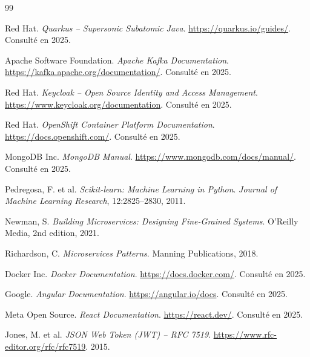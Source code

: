 \documentclass[12pt,a4paper]{report}
\begin{document}
\begin{thebibliography}{99}

Red Hat. \textit{Quarkus -- Supersonic Subatomic Java}.
\url{https://quarkus.io/guides/}. Consult\'e en 2025.

Apache Software Foundation. \textit{Apache Kafka Documentation}.
\url{https://kafka.apache.org/documentation/}. Consult\'e en 2025.

Red Hat. \textit{Keycloak -- Open Source Identity and Access Management}.
\url{https://www.keycloak.org/documentation}. Consult\'e en 2025.

Red Hat. \textit{OpenShift Container Platform Documentation}.
\url{https://docs.openshift.com/}. Consult\'e en 2025.

MongoDB Inc. \textit{MongoDB Manual}.
\url{https://www.mongodb.com/docs/manual/}. Consult\'e en 2025.

Pedregosa, F. et al. \textit{Scikit-learn: Machine Learning in Python}.
\textit{Journal of Machine Learning Research}, 12:2825--2830, 2011.

Newman, S. \textit{Building Microservices: Designing Fine-Grained Systems}.
O'Reilly Media, 2nd edition, 2021.

Richardson, C. \textit{Microservices Patterns}.
Manning Publications, 2018.

Docker Inc. \textit{Docker Documentation}.
\url{https://docs.docker.com/}. Consult\'e en 2025.

Google. \textit{Angular Documentation}.
\url{https://angular.io/docs}. Consult\'e en 2025.

Meta Open Source. \textit{React Documentation}.
\url{https://react.dev/}. Consult\'e en 2025.

Jones, M. et al. \textit{JSON Web Token (JWT) -- RFC 7519}.
\url{https://www.rfc-editor.org/rfc/rfc7519}. 2015.

\end{thebibliography}
\end{document}

